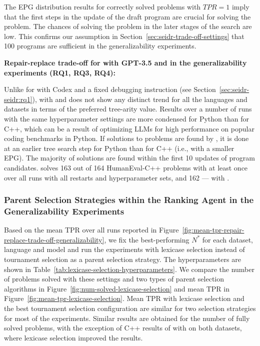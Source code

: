 The EPG distribution results for correctly solved problems with $TPR=1$ imply that the first steps in the update of the draft program are crucial for solving the problem. 
The chances of solving the problem in the later stages of the search are low.
This confirms our assumption in Section~\ref{sec:seidr-trade-off-settings} that 100 programs are sufficient in the generalizability experiments.

\begin{framed}
\textbf{Repair-replace trade-off for \method{} with GPT-3.5 and \llama{} in the generalizability experiments (RQ1, RQ3, RQ4):}

Unlike for \method{} with Codex and a fixed debugging instruction (see Section~\ref{sec:seidr-seidr:rq1}), \method{} with \gpt{} and \llama{} does not show any distinct trend for all the languages and datasets in terms of the preferred tree-arity value. 
Results over a number of runs with the same hyperparameter settings are more condensed for Python than for C++, which can be a result of optimizing LLMs for high performance on popular coding benchmarks in Python.
If solutions to problems are found by \method{}, it is done at an earlier tree search step for Python than for C++ (i.e., with a smaller EPG). 
The majority of solutions are found within the first 10 updates of program candidates. 
\method{} solves 163 out of 164 HumanEval-C++ problems with \gpt{} at least once over all runs with all restarts and hyperparameter sets, and 162 --- with \llama{}.
\end{framed}



\subsubsection{Parent Selection Strategies within the Ranking Agent in the Generalizability Experiments}
\label{sec:seidr-lexicase-results}

Based on the mean TPR over all runs reported in Figure~\ref{fig:mean-tpr-repair-replace-trade-off-generalizability}, we fix the best-performing $N^*$ for each dataset, language and model and run the experiments with lexicase selection instead of tournament selection as a parent selection strategy. 
The hyperparameters are shown in Table~\ref{tab:lexicase-selection-hyperparameters}.
We compare the number of problems solved  with these settings and two types of parent selection algorithms in Figure~\ref{fig:num-solved-lexicase-selection} and mean TPR in Figure~\ref{fig:mean-tpr-lexicase-selection}.
Mean TPR with lexicase selection and the best tournament selection configuration are similar for two selection strategies for most of the experiments.
Similar results are obtained for the number of fully solved problems, with the exception of C++ results of \method{} with \gpt{} on both datasets, where lexicase selection improved the results.

